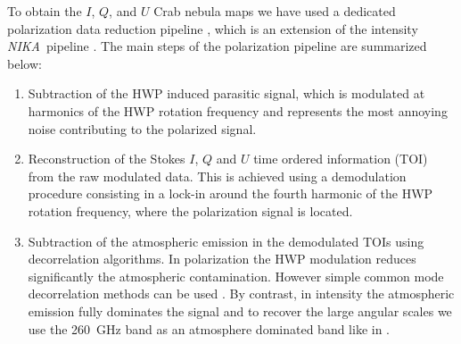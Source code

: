 \documentclass[twocolumn,traditabstract]{aa}
\def\NIKA{\textit{NIKA}}
\begin{document}
To obtain the $I$, $Q$, and $U$ Crab nebula maps we have used a dedicated
polarization data reduction pipeline \citep{ritacco2017}, which is an extension
of the intensity \NIKA\ pipeline \citep{catalano2014,adam2013}. The main steps
of the polarization pipeline are summarized below:
\begin{enumerate}
\item  Subtraction of the HWP induced parasitic signal, which is modulated at harmonics of the HWP rotation frequency and represents the most annoying noise contributing to the polarized signal. 
\item Reconstruction of the Stokes $I$, $Q$ and $U$ time ordered information (TOI) from the raw modulated data. This is achieved using a demodulation procedure consisting in a lock-in around the fourth harmonic of the HWP rotation frequency, where the polarization signal is located.
\item Subtraction of the atmospheric emission in the demodulated TOIs using
  decorrelation algorithms. In polarization the HWP modulation reduces
  significantly the atmospheric contamination. However simple common mode
  decorrelation methods can be used \citep{ritacco2017}. By contrast, in
  intensity the atmospheric emission fully dominates the signal and to recover
  the large angular scales we use the 260~GHz band as an atmosphere
    dominated band like in \cite{adam2013}.



\end{enumerate}
\end{document}
